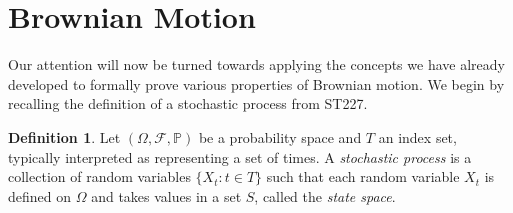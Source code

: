\documentclass[a4paper,11pt]{article}
\theoremstyle{plain}
\theoremstyle{definition}
\newtheorem{definition}[theorem]{Definition}
\begin{document}







\section{Brownian Motion}

Our attention will now be turned towards applying the concepts we have already developed to formally prove various properties of Brownian motion. We begin by recalling the definition of a stochastic process from ST227.



\begin{definition}
Let $(\Omega,\mathcal{F},\mathbb{P})$ be a probability space and $T$ an index set, typically interpreted as representing a set of times. A \textit{stochastic process} is a collection of random variables $\{X_t:t \in T\}$ such that each random variable $X_t$ is defined on $\Omega$ and takes values in a set $S$, called the \textit{state space}.
\end{definition}
\end{document}
